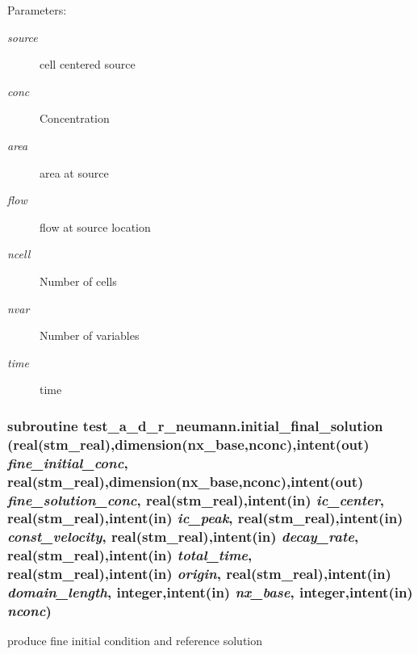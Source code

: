 \begin{Desc}
\item[Parameters:]
\begin{description}
\item[{\em source}]cell centered source \item[{\em conc}]Concentration\item[{\em area}]area at source \item[{\em flow}]flow at source location\item[{\em ncell}]Number of cells\item[{\em nvar}]Number of variables\item[{\em time}]time \end{description}
\end{Desc}
\hypertarget{a00073_9f20e21758429fe71c04c49fb7669c5d}{
\subsubsection[{initial\_\-final\_\-solution}]{\setlength{\rightskip}{0pt plus 5cm}subroutine test\_\-a\_\-d\_\-r\_\-neumann.initial\_\-final\_\-solution (real(stm\_\-real),dimension(nx\_\-base,nconc),intent(out) {\em fine\_\-initial\_\-conc}, \/  real(stm\_\-real),dimension(nx\_\-base,nconc),intent(out) {\em fine\_\-solution\_\-conc}, \/  real(stm\_\-real),intent(in) {\em ic\_\-center}, \/  real(stm\_\-real),intent(in) {\em ic\_\-peak}, \/  real(stm\_\-real),intent(in) {\em const\_\-velocity}, \/  real(stm\_\-real),intent(in) {\em decay\_\-rate}, \/  real(stm\_\-real),intent(in) {\em total\_\-time}, \/  real(stm\_\-real),intent(in) {\em origin}, \/  real(stm\_\-real),intent(in) {\em domain\_\-length}, \/  integer,intent(in) {\em nx\_\-base}, \/  integer,intent(in) {\em nconc})}}
\label{a00073_9f20e21758429fe71c04c49fb7669c5d}


produce fine initial condition and reference solution 

